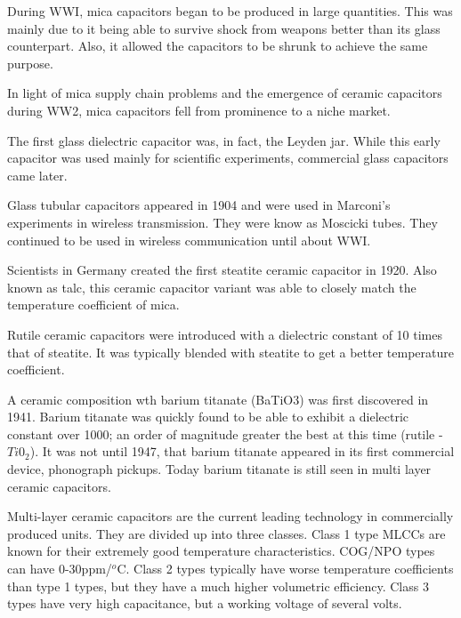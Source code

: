 \noindent During WWI, mica capacitors began to be produced in large quantities. This was mainly due to it being able to survive shock from weapons better than its glass counterpart. Also, it allowed the capacitors to be shrunk to achieve the same purpose. \cite[f.~37-41]{dumInv}

\noindent In light of mica supply chain problems and the emergence of ceramic capacitors during WW2, mica capacitors fell from prominence to a niche market.\cite[Ch 3, Sec II]{cerMaterials}

\noindent The first glass dielectric capacitor was, in fact, the Leyden jar. While this early capacitor was used mainly for scientific experiments, commercial glass capacitors came later. 

\noindent Glass tubular capacitors appeared in 1904 and were used in Marconi's experiments in wireless transmission. They were know as Moscicki tubes. They continued to be used in wireless communication until about WWI. \cite[p.~102]{dumInv}

\noindent Scientists in Germany created the first steatite ceramic capacitor in 1920. \cite[Ch 3 Sec II]{cerMaterials} \cite{cerDie} Also known as talc, this ceramic capacitor variant was able to closely match the temperature coefficient of mica.\cite{steatite_hf}     

\noindent Rutile ceramic capacitors were introduced with a dielectric constant of 10 times that of steatite. It was typically blended with steatite to get a better temperature coefficient. 

\noindent A ceramic composition wth barium titanate (BaTiO3) was first discovered in 1941. Barium titanate was quickly found to be able to exhibit a dielectric constant over 1000; an order of magnitude greater the best at this time (rutile - $Ti0_2$). It was not until 1947, that barium titanate appeared in its first commercial device, phonograph pickups.\cite{piezCer}\cite{hist_cerFilt}\cite[Ch 3 Sec III]{cerMaterials} Today barium titanate is still seen in multi layer ceramic capacitors.

\noindent Multi-layer ceramic capacitors are the current leading technology in commercially produced units. They are divided up into three classes. Class 1 type MLCCs are known for their extremely good temperature characteristics. COG/NPO types can have 0-30ppm/$^o$C. Class 2 types typically have worse temperature coefficients than type 1 types, but they have a much higher volumetric efficiency. Class 3 types have very high capacitance, but a working voltage of several volts.\cite{hist_cerFilt}\cite[Ch 3 Sec VI]{cerMaterials}\cite{atCer_tempco}

